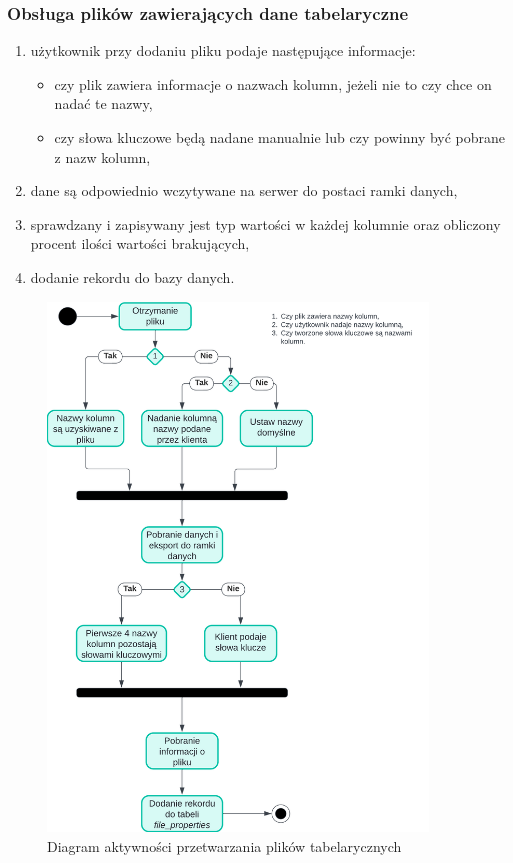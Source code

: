 \documentclass[12pt,a4paper,twoside]{article}
\begin{document}
\subsubsection*{Obsługa plików zawierających dane tabelaryczne}
\begin{enumerate}
	\item użytkownik przy dodaniu pliku podaje następujące informacje:
	\begin{itemize}
		\item czy plik zawiera informacje o nazwach kolumn, jeżeli nie to czy chce on nadać te nazwy,
		\item czy słowa kluczowe będą nadane manualnie lub czy powinny być pobrane z nazw kolumn,
	\end{itemize}
	\item dane są odpowiednio wczytywane na serwer do postaci ramki danych,
	\item sprawdzany i zapisywany jest typ wartości w każdej kolumnie oraz obliczony procent ilości wartości brakujących,
	\item dodanie rekordu do bazy danych.
\end{enumerate}
\begin{figure}[h!]
\centering
  \includegraphics[width=0.9\textwidth]{img/csvac.png}
  \caption{Diagram aktywności przetwarzania plików tabelarycznych}
\end{figure}
\clearpage
\newpage
\end{document}
